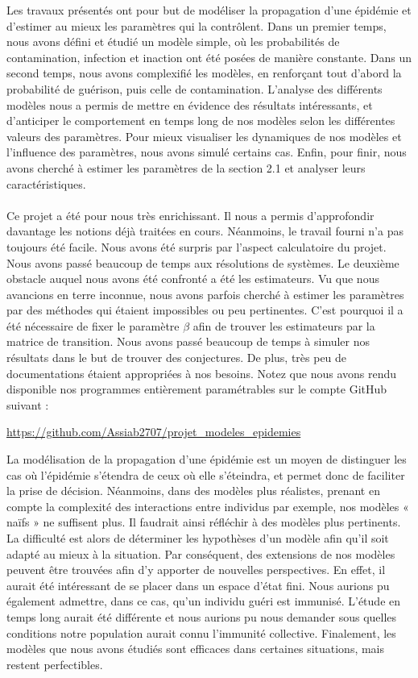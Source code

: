 \documentclass[12pt,a4paper]{report}
\theoremstyle{remark}
\begin{document}
Les travaux présentés ont pour but de modéliser la propagation d'une épidémie et d’estimer au mieux les paramètres qui la contrôlent. Dans un premier temps, nous avons défini et étudié un modèle simple, où les probabilités de contamination, infection et inaction ont été posées de manière constante. Dans un second temps, nous avons complexifié les modèles, en renforçant tout d’abord la probabilité de guérison, puis celle de  contamination. L’analyse des différents modèles nous a permis de mettre en évidence des résultats intéressants, et d’anticiper le comportement en temps long de nos modèles selon les différentes valeurs des paramètres. Pour mieux visualiser les dynamiques de nos modèles et l’influence des paramètres, nous avons simulé certains cas. Enfin, pour finir,  nous avons cherché à estimer les paramètres de la section 2.1 et analyser leurs caractéristiques.
\\
\\
Ce projet a été pour nous très enrichissant. Il nous a permis d’approfondir davantage les notions déjà traitées en cours. Néanmoins, le travail fourni n’a pas toujours été facile. Nous avons été surpris par l'aspect calculatoire du projet. Nous avons passé beaucoup de temps aux résolutions de systèmes. Le deuxième obstacle auquel nous avons été confronté a été les estimateurs. Vu que nous avancions en terre inconnue, nous avons parfois cherché à estimer les paramètres par des méthodes qui étaient impossibles ou peu pertinentes. C’est pourquoi il a été nécessaire de fixer le paramètre $\beta$ afin de trouver les estimateurs par la matrice de transition. Nous avons passé beaucoup de temps à simuler nos résultats dans le but de trouver des conjectures. De plus, très peu de documentations étaient appropriées à nos besoins. Notez que nous avons rendu disponible nos programmes entièrement paramétrables sur le compte GitHub suivant :  
\begin{center}
    \url{https://github.com/Assiab2707/projet_modeles_epidemies}
\end{center}

La modélisation de la propagation d’une épidémie est un moyen de distinguer les cas où l’épidémie s’étendra de ceux où elle s’éteindra, et permet donc de faciliter la prise de décision. Néanmoins, dans des modèles plus réalistes, prenant en compte la complexité des interactions entre individus par exemple, nos modèles « naïfs » ne suffisent plus. Il faudrait ainsi réfléchir à des modèles plus pertinents. La difficulté est alors de déterminer les hypothèses d’un modèle afin qu’il soit adapté au mieux à la situation. Par conséquent, des extensions de nos modèles peuvent être trouvées afin d’y apporter de nouvelles perspectives. En effet, il aurait été intéressant de se placer dans un espace d’état fini. Nous aurions pu également admettre, dans ce cas, qu’un individu guéri est immunisé. L’étude en temps long aurait été différente et nous aurions pu nous demander sous quelles conditions notre population aurait connu l’immunité collective. Finalement, les modèles que nous avons étudiés sont efficaces dans certaines situations, mais restent perfectibles.
\end{document}
